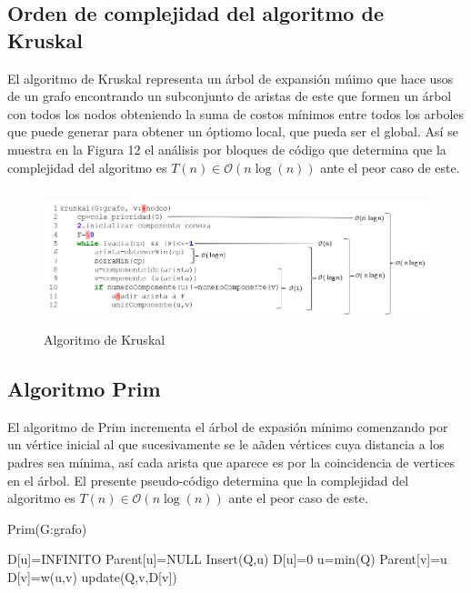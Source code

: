 \documentclass[12pt,twoside]{article}
\begin{document}
    \subsection{Orden de complejidad del algoritmo de Kruskal}
        El algoritmo de Kruskal representa un \'arbol de expansi\'on m\'nimo que hace usos de un grafo encontrando un subconjunto de aristas de este que formen un \'arbol con todos los nodos obteniendo la suma de costos mínimos entre todos los arboles que puede generar para obtener un \'optiomo local, que pueda ser el global. As\'i se muestra en la Figura 12 el an\'alisis por bloques de c\'odigo que determina que la complejidad del algoritmo es $T(n)\in\mathcal{O}(n\log(n))$ ante el peor caso de este.   
        \begin{figure}[H]
        \centering
        \includegraphics[height=4cm]{imagenes/complejidad_kruskal.png}
        \caption{Algoritmo de Kruskal}
    \end{figure}
    \newpage
    \subsection{Algoritmo Prim} 
    El algoritmo de Prim incrementa el \'arbol de expasi\'on m\'inimo comenzando por un v\'ertice inicial al que sucesivamente se le a\~aden v\'ertices cuya distancia a los padres sea m\'inima, as\'i cada arista que aparece es por la coincidencia de vertices en el \'arbol. El presente pseudo-c\'odigo determina que la complejidad del algoritmo es $T(n)\in\mathcal{O}(n\log(n))$ ante el peor caso de este.
    \begin{algorithm}[H]
        \caption{ Prim(G:grafo)}
        \begin{algorithmic}[1]
            \State D[u]=INFINITO
            \State Parent[u]=NULL
            \State Insert(Q,u)
        \EndFor
		\State D[u]=0
		    \State u=min(Q)
		            \State Parent[v]=u
		            \State D[v]=w(u,v)
		            \State update(Q,v,D[v])
		        \EndIf
		    \EndFor
		\EndWhile
        \end{algorithmic}
    \end{algorithm}
        
\end{document}
